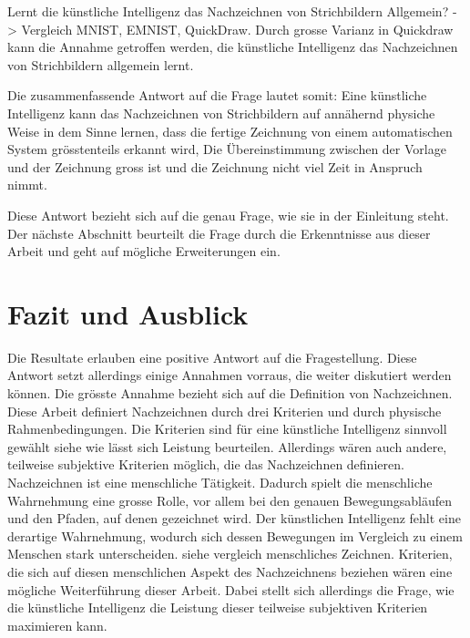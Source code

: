 Lernt die künstliche Intelligenz das Nachzeichnen von Strichbildern Allgemein?
-> Vergleich MNIST, EMNIST, QuickDraw. Durch grosse Varianz in Quickdraw kann
die Annahme getroffen werden, die künstliche Intelligenz das Nachzeichnen von
Strichbildern allgemein lernt.

Die zusammenfassende Antwort auf die Frage lautet somit: Eine künstliche
Intelligenz kann das Nachzeichnen von Strichbildern auf annähernd physiche Weise
in dem Sinne lernen, dass die fertige Zeichnung von einem automatischen System
grösstenteils erkannt wird, Die Übereinstimmung zwischen der Vorlage und der
Zeichnung gross ist und die Zeichnung nicht viel Zeit in Anspruch nimmt.

Diese Antwort bezieht sich auf die genau Frage, wie sie in der Einleitung steht.
Der nächste Abschnitt beurteilt die Frage durch die Erkenntnisse aus dieser
Arbeit und geht auf mögliche Erweiterungen ein.



\section{Fazit und Ausblick}
Die Resultate erlauben eine positive Antwort auf die Fragestellung. Diese
Antwort setzt allerdings einige Annahmen vorraus, die weiter diskutiert werden
können. Die grösste Annahme bezieht sich auf die Definition von Nachzeichnen.
Diese Arbeit definiert Nachzeichnen durch drei Kriterien und durch physische
Rahmenbedingungen. Die Kriterien sind für eine künstliche Intelligenz sinnvoll
gewählt {siehe wie lässt sich Leistung beurteilen}. Allerdings wären auch
andere, teilweise subjektive Kriterien möglich, die das Nachzeichnen definieren.
Nachzeichnen ist eine menschliche Tätigkeit. Dadurch spielt die menschliche
Wahrnehmung eine grosse Rolle, vor allem bei den genauen Bewegungsabläufen und
den Pfaden, auf denen gezeichnet wird. Der künstlichen Intelligenz fehlt eine
derartige Wahrnehmung, wodurch sich dessen Bewegungen im Vergleich zu einem
Menschen stark unterscheiden. {siehe vergleich menschliches Zeichnen}.
Kriterien, die sich auf diesen menschlichen Aspekt des Nachzeichnens beziehen
wären eine mögliche Weiterführung dieser Arbeit. Dabei stellt sich allerdings
die Frage, wie die künstliche Intelligenz die Leistung dieser teilweise
subjektiven Kriterien maximieren kann.


